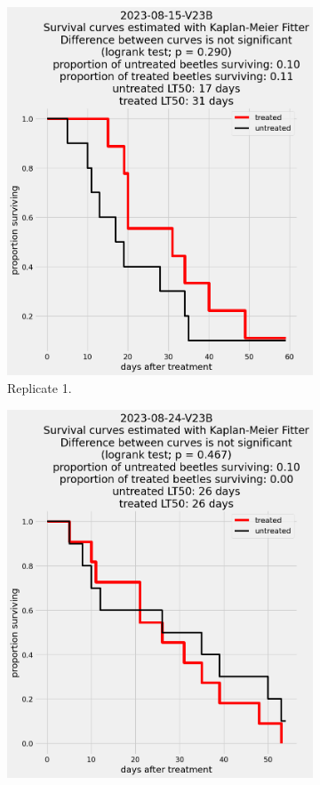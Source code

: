 \documentclass[12pt,letterpaper,english,bibliography=totocnumbered, abstract=on]{scrartcl}
\begin{document}
\begin{figure}[h]
	\centering
	\begin{subfigure}{.3\textwidth}
		\includegraphics[width=\linewidth]{images/survival_curves/2023-08-15-V23B}
		\caption{Replicate 1.}
	\end{subfigure}
	\begin{subfigure}{.3\textwidth}
		\includegraphics[width=\textwidth]{images/survival_curves/2023-08-24-V23B}

\end{subfigure}
\end{figure}
\end{document}
